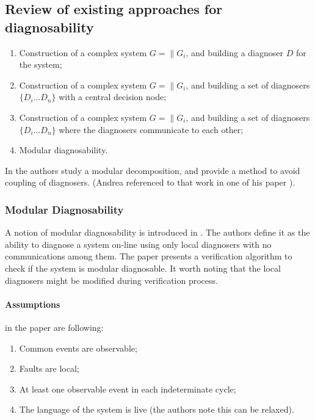 \documentclass[a4paper,oneside]{article}
\begin{document}
\subsection{Review of existing approaches for diagnosability}
\begin{enumerate}
  \item Construction of a complex system $G = \parallel G_i$, and building a
  diagnoser $D$ for the system; 
  \item Construction of a complex system $G = \parallel G_i$, and building a set
  of diagnosers $\{D_i \ldots D_n\}$ with a central decision node;
  \item Construction of a complex system $G = \parallel G_i$, and building a set
  of diagnosers $\{D_i \ldots D_n\}$ where the diagnosers communicate to each
  other;
  \item Modular diagnosability.
\end{enumerate}

In \cite{garcia_centralized_2002} the authors study a modular
decomposition, and provide a method to avoid coupling of diagnosers.
(Andrea referenced to that work in one of his paper \cite{paoli_safe_2003}).

\subsubsection{Modular Diagnosability}
\label{sec_modular_diagnosability}
A notion of modular diagnosability is introduced in
\cite{contant_diagnosability_2006}. The authors define it as the ability to
diagnose a system on-line using only local diagnosers with no communications
among them. The paper presents a verification algorithm to check if the system
is modular diagnosable. It worth noting that the local diagnosers might be
modified during verification process.

\paragraph{Assumptions} in the paper are following:
\begin{enumerate}
  \item Common events are observable;
  \item Faults are local;
  \item At least one observable event in each indeterminate cycle;
  \item The language of the system is live (the authors note this can be
  relaxed).
\end{enumerate}
\end{document}
